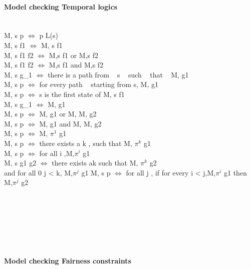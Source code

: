 \paragraph{Model checking Temporal logics} \\
M, s \models p $\Leftrightarrow$ p \in L(s) \\
M, s \models \not f1 $\Leftrightarrow$ M, s \nvdash f1 \\
M, s \models f1 \vee f2 $\Leftrightarrow$ M,s \models f1 or M,s \nvdash f2 \\
M, s \models f1 \wedge f2 $\Leftrightarrow$  M,s \models f1 and M,s \nvdash f2 \\
M, s \models {} g_{1} $\Leftrightarrow$ there is a path \pi  from ~  s ~   such ~  that  ~ M, \pi \models g1 \\
M, s \models p $\Leftrightarrow$ for every path \pi  ~ starting from s, M, \pi \models g1 \\
M, s \models p $\Leftrightarrow$ s is the first state of \piand M, s \models f1 \\
M, s \models \not g_{1} $\Leftrightarrow$ M, \pi  \nvdash g1\\
M, s \models p $\Leftrightarrow$  M, \pi  \models g1  or  M, \pi  M, \pi  \models g2\\
M, s \models p $\Leftrightarrow$ M, \pi  \models g1  and  M, \pi  M, \pi  \models g2 \\
M, s \models p $\Leftrightarrow$ M, $\pi^{1}$ \models g1 \\
M, s \models p $\Leftrightarrow$ there exists a k , such that M, $\pi^{k}$  \models g1\\
M, s \models p $\Leftrightarrow$ for all i ,M,$\pi^{i}$ \models g1 \\
M, s \models g1 \bugcup g2 $\Leftrightarrow$ there exists ak  such that M, $\pi^{k}$ \models g2\\
and for all 0 \le j < k, M,$\pi^{j}$ \models g1
M, s \models p $\Leftrightarrow$ for all j , if for every i < j,M,$\pi^{i}$ \nvdash g1 then M,$\pi^{j}$ \models g2\\

\leg \\
\geq \\
\Re \\
\partial \\
\bigup \\
\bigcap \\


\paragraph{Model checking Fairness constraints}
